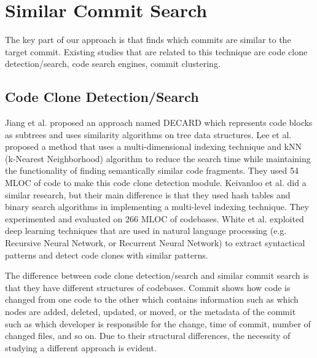 \section{Similar Commit Search}
The key part of our approach is that {\simfin} finds which commits are similar to the target commit.
Existing studies that are related to this technique are code clone detection/search, code search engines, commit clustering.

\subsection{Code Clone Detection/Search}
Jiang et al. \cite{jiang2007deckard} proposed an approach named DECARD which represents code blocks as subtrees and uses similarity algorithms on tree data structures.
Lee et al. \cite{lee2010instant} proposed a method that uses a multi-dimensional indexing technique and kNN (k-Nearest Neighborhood) algorithm to reduce the search time while maintaining the functionality of finding semantically similar code fragments.
They used 54 MLOC of code to make this code clone detection module.
Keivanloo et al. \cite{keivanloo2011internet} did a similar research, but their main difference is that they used hash tables and binary search algorithms in implementing a multi-level indexing technique.
They experimented and evaluated on 266 MLOC of codebases.
White et al. \cite{white2016deep} exploited deep learning techniques that are used in natural language processing (e.g. Recursive Neural Network, or Recurrent Neural Network) to extract syntactical patterns and detect code clones with similar patterns. 

The difference between code clone detection/search and similar commit search is that they have different structures of codebases.
Commit shows how code is changed from one code to the other which contains information such as which nodes are added, deleted, updated, or moved, or the metadata of the commit such as which developer is responsible for the change, time of commit, number of changed files, and so on.
Due to their structural differences, the necessity of studying a different approach is evident. 

